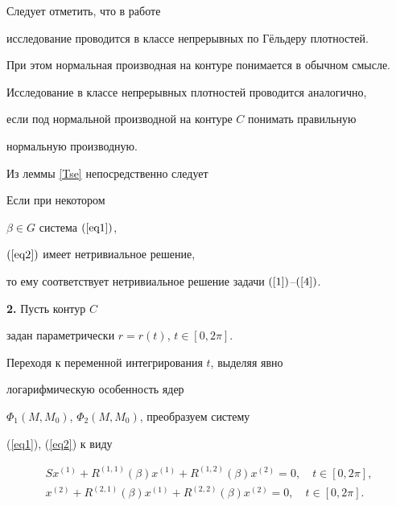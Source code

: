 Следует отметить, что в работе \cite{209611220017} 


исследование проводится в классе непрерывных по Г\"ельдеру плотностей.


При этом нормальная производная на контуре понимается в обычном смысле. 


Исследование в классе непрерывных плотностей проводится аналогично, 


если под нормальной производной на контуре $C$ понимать правильную 


нормальную производную.





Из леммы \ref{Tse} непосредственно следует 





\begin{thm}


\label{k}


Если при некотором 


$\beta \in G$ система $(\ref{eq1})$,


$(\ref{eq2})$ имеет нетривиальное решение,


то ему соответствует нетривиальное решение задачи $(\ref{1})$--$(\ref{4})$. 


\end{thm}





{\bf 2.} Пусть контур $C$ 


задан параметрически $r=r(t)$, $t\in [0,2\pi]$.


Переходя к переменной интегрирования $t$, выделяя явно 


логарифмическую особенность ядер 


$\Phi_1(M,M_0)$, $\Phi_2(M,M_0)$, преобразуем систему 


(\ref{eq1}), (\ref{eq2}) к виду


\begin{gather}


\label{eq1.1}


Sx^{(1)}+R^{(1,1)}(\beta)x^{(1)}+R^{(1,2)}(\beta)x^{(2)}=0,


\quad t \in [0,2\pi],\\


\label{eq1.2}


x^{(2)}+R^{(2,1)}(\beta)x^{(1)}+R^{(2,2)}(\beta)x^{(2)}=0,


\quad t \in [0,2\pi].


\end{gather}


